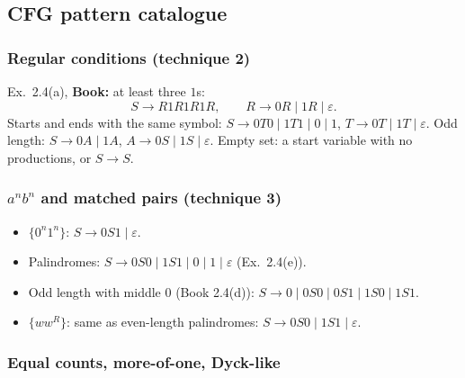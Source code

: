 \documentclass[11pt,a4paper]{article}
\newcommand{\eps}{\varepsilon}
\begin{document}
\subsection{CFG pattern catalogue}

\subsubsection{Regular conditions (technique 2)}

Ex.~2.4(a), \textbf{Book:} at least three $1$s:
\[
  S\to R1R1R1R,\qquad R\to 0R\mid 1R\mid\eps.
\]
Starts and ends with the same symbol:
$S\to 0T0\mid 1T1\mid 0\mid 1$, $T\to 0T\mid 1T\mid\eps$.
Odd length: $S\to 0A\mid 1A$, $A\to 0S\mid 1S\mid\eps$.
Empty set: a start variable with no productions, or $S\to S$.

\subsubsection{$a^nb^n$ and matched pairs (technique 3)}

\begin{itemize}[nosep]
  \item $\{0^n1^n\}$: $S\to 0S1\mid\eps$.
  \item Palindromes: $S\to 0S0\mid 1S1\mid 0\mid 1\mid\eps$
        (Ex.~2.4(e)).
  \item Odd length with middle $0$ (Book 2.4(d)):
        $S\to 0\mid 0S0\mid 0S1\mid 1S0\mid 1S1$.
  \item $\{ww^R\}$: same as even-length palindromes:
        $S\to 0S0\mid 1S1\mid\eps$.
\end{itemize}

\subsubsection{Equal counts, more-of-one, Dyck-like}
\end{document}
